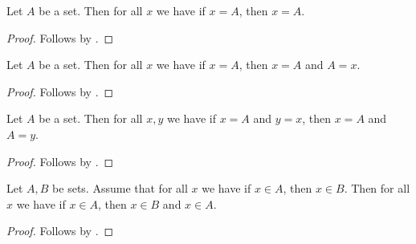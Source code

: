 \begin{proposition}\label{prepared_logical_closed}
    Let $A$ be a set.
    Then for all $x$ we have if $x=A$, then $x=A$.
\end{proposition}
\begin{proof}
    Follows by \auto.
\end{proof}

\begin{proposition}\label{prepared_logical_residual}
    Let $A$ be a set.
    Then for all $x$ we have if $x=A$, then $x=A$ and $A=x$.
\end{proposition}
\begin{proof}
    Follows by \auto.
\end{proof}

\begin{proposition}\label{prepared_logical_nested}
    Let $A$ be a set.
    Then for all $x,y$ we have if $x=A$ and $y=x$, then $x=A$ and $A=y$.
\end{proposition}
\begin{proof}
    Follows by \auto.
\end{proof}

\begin{proposition}\label{prepared_logical_supplied_clause}
    Let $A,B$ be sets.
    Assume that for all $x$ we have if $x\in A$, then $x\in B$.
    Then for all $x$ we have if $x\in A$, then $x\in B$ and $x\in A$.
\end{proposition}
\begin{proof}
    Follows by \auto.
\end{proof}
